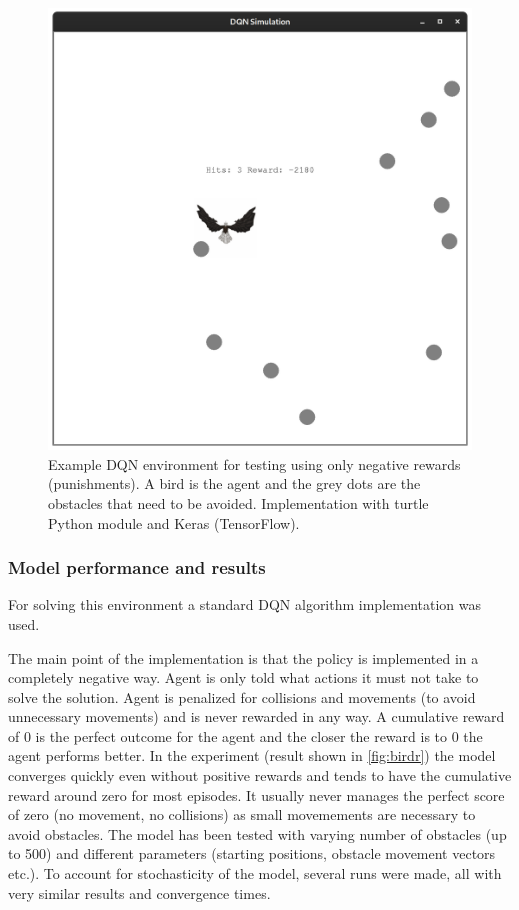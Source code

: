 \documentclass[b5paper]{book}
\begin{document}
\begin{figure}[!ht]
  \centering
  \includegraphics[scale=0.1]{figures/dqn_bird.png} 
  \caption{Example DQN environment for testing using only negative rewards (punishments). A bird is the agent and the grey dots are the obstacles that need to be avoided. Implementation with turtle Python module and Keras (TensorFlow).}
  \label{fig:bird}
\end{figure}

\subsubsection{Model performance and results}

For solving this environment a standard DQN algorithm implementation was used. 

The main point of the implementation is that the policy is implemented in a completely negative way. Agent is only told what actions it must not take to solve the solution. Agent is penalized for collisions and movements (to avoid unnecessary movements) and is never rewarded in any way. A cumulative reward of 0 is the perfect outcome for the agent and the closer the reward is to 0 the agent performs better. In the experiment (result shown in \ref{fig:birdr}) the model converges quickly even without positive rewards and tends to have the cumulative reward around zero for most episodes. It usually never manages the perfect score of zero (no movement, no collisions) as small movemements are necessary to avoid obstacles. The model has been tested with varying number of obstacles (up to 500) and different parameters (starting positions, obstacle movement vectors etc.). To account for stochasticity of the model, several runs were made, all with very similar results and convergence times.  
\end{document}
